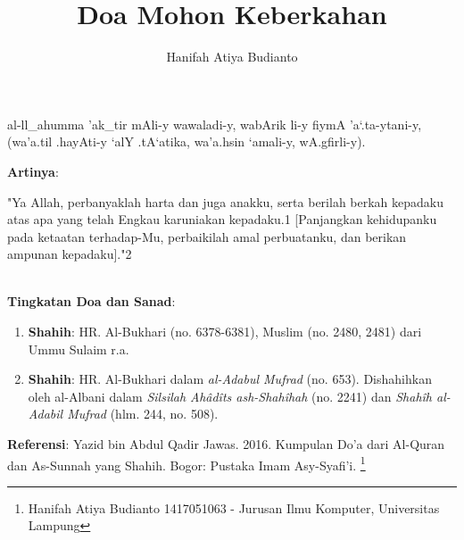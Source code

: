\documentclass[a4paper,12pt]{article}
\title{\Large Doa Mohon Keberkahan}
\author{\calligra Hanifah Atiya Budianto}
\begin{document}
\sffamily
\maketitle 
\fullvocalize
{}
\begin{arabtext}
\noindent
al-ll_ahumma 'ak_tir mAli-y wawaladi-y, wabArik li-y fiymA 'a`.ta-ytani-y, 
(wa'a.til .hayAti-y `alY .tA`atika, wa'a.hsin `amali-y, wA.gfirli-y).\\
\end{arabtext}
\noindent
\textbf{Artinya}:
\par
\indent
"Ya Allah, perbanyaklah harta dan juga anakku, serta berilah berkah 
kepadaku atas apa yang telah Engkau karuniakan kepadaku.{\scriptsize 1}
[Panjangkan kehidupanku pada ketaatan terhadap-Mu, perbaikilah amal 
perbuatanku, dan berikan ampunan kepadaku]."{\scriptsize 2}\\\\
\par
\noindent
\textbf{Tingkatan Doa dan Sanad}:
\begin{enumerate}
\item \textbf{Shahih}: HR. Al-Bukhari (no. 6378-6381), Muslim (no. 2480, 
2481) dari Ummu Sulaim r.a.
\item \textbf{Shahih}: HR. Al-Bukhari dalam \textit{al-Adabul Mufrad} (no. 
653). Dishahihkan oleh al-Albani dalam \textit{Silsilah Ah\^{a}d\^{i}ts 
ash-Shah\^{i}hah} (no. 2241) dan \textit{Shah\^{i}h al-Adabil Mufrad} 
(hlm. 244, no. 508).
\end{enumerate}
\textbf{Referensi}: Yazid bin Abdul Qadir Jawas. 2016. Kumpulan Do'a dari
Al-Quran dan As-Sunnah yang Shahih. Bogor: Pustaka Imam Asy-Syafi'i.
\footnote{Hanifah Atiya Budianto 1417051063 - Jurusan Ilmu Komputer,
Universitas Lampung}
\end{document}
